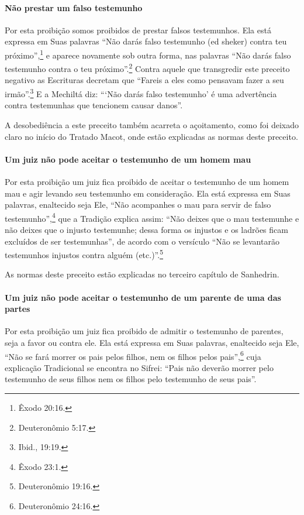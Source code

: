 \begin{multicols}{2}
\paragraph{Não prestar um falso testemunho}

Por esta proibição somos proibidos de prestar falsos testemunhos. Ela
está expressa em Suas palavras ``Não darás falso testemunho (ed sheker\starr)
contra teu próximo'',\footnote{Êxodo 20:16.} e aparece novamente sob outra
forma, nas palavras ``Não darás falso testemunho contra o teu próximo''.\footnote{Deuteronômio 5:17.} Contra aquele que transgredir este preceito
negativo as Escrituras decretam que ``Fareis a eles como pensavam fazer
a seu irmão''.\footnote{Ibid., 19:19.} E a Mechiltá\starr{} diz: ```Não darás falso
testemunho' é uma advertência contra testemunhas que tencionem causar
danos''.

A desobediência a este preceito também acarreta o açoitamento, como foi
deixado claro no início do Tratado Macot\starr, onde estão explicadas as
normas deste preceito.

\paragraph{Um juiz não pode aceitar o testemunho de um homem mau}

Por esta proibição um juiz fica proibido de aceitar o testemunho de um
homem mau e agir levando seu testemunho em consideração. Ela está
expressa em Suas palavras, enaltecido seja Ele, ``Não acompanhes o mau
para servir de falso testemunho'',\footnote{Êxodo 23:1.} que a Tradição explica
assim: ``Não deixes que o mau testemunhe e não deixes que o injusto
testemunhe; dessa forma os injustos e os ladrões ficam excluídos de ser
testemunhas'', de acordo com o versículo ``Não se levantarão testemunhos
injustos contra alguém (etc.)''.\footnote{Deuteronômio 19:16.}

As normas deste preceito estão explicadas no terceiro capítulo de Sanhedrin\starr.

\paragraph{Um juiz não pode aceitar o testemunho de um parente de uma das partes}

Por esta proibição um juiz fica proibido de admitir o testemunho de
parentes, seja a favor ou contra ele. Ela está expressa em Suas
palavras, enaltecido seja Ele, ``Não se fará morrer os pais pelos
filhos, nem os filhos pelos pais'',\footnote{Deuteronômio 24:16.} cuja explicação
Tradicional se encontra no Sifrei\starr: ``Pais não deverão morrer pelo
testemunho de seus filhos nem os filhos pelo testemunho de seus pais''.


\end{multicols}

